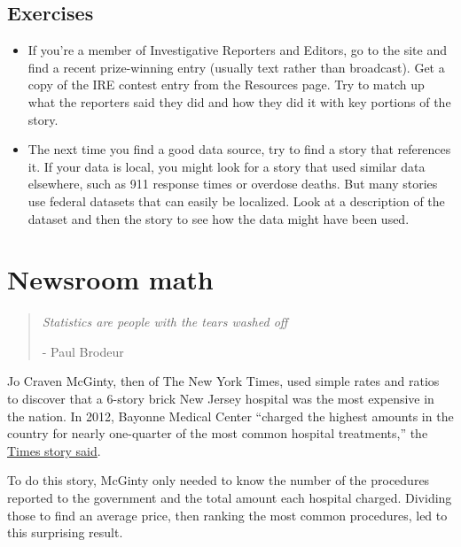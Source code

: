 \documentclass[
  letterpaper,
  DIV=11,
  numbers=noendperiod]{scrreprt}
\begin{document}
\hypertarget{exercises}{%
\section{Exercises}\label{exercises}}

\begin{itemize}
\item
  If you're a member of Investigative Reporters and Editors, go to the
  site and find a recent prize-winning entry (usually text rather than
  broadcast). Get a copy of the IRE contest entry from the Resources
  page. Try to match up what the reporters said they did and how they
  did it with key portions of the story.
\item
  The next time you find a good data source, try to find a story that
  references it. If your data is local, you might look for a story that
  used similar data elsewhere, such as 911 response times or overdose
  deaths. But many stories use federal datasets that can easily be
  localized. Look at a description of the dataset and then the story to
  see how the data might have been used.
\end{itemize}


\hypertarget{start-math}{%
\chapter{Newsroom math}\label{start-math}}

\begin{quote}
\emph{Statistics are people with the tears washed off}

- Paul Brodeur
\end{quote}

Jo Craven McGinty, then of The New York Times, used simple rates and
ratios to discover that a 6-story brick New Jersey hospital was the most
expensive in the nation. In 2012, Bayonne Medical Center ``charged the
highest amounts in the country for nearly one-quarter of the most common
hospital treatments,'' the
\href{https://www.nytimes.com/2013/05/17/business/bayonne-medical-center-has-highest-us-billing-rates.html}{Times
story said}.

To do this story, McGinty only needed to know the number of the
procedures reported to the government and the total amount each hospital
charged. Dividing those to find an average price, then ranking the most
common procedures, led to this surprising result.
\end{document}
